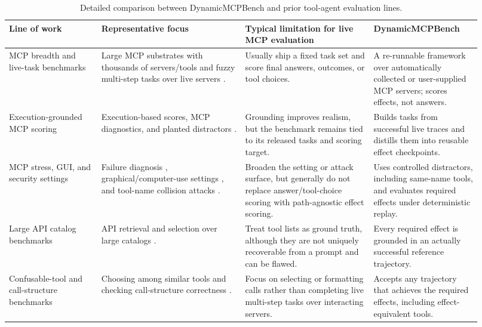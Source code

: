 \begin{table}[t]
\centering
\small
\setlength{\tabcolsep}{3.0pt}
\renewcommand{\arraystretch}{1.02}
\caption{Detailed comparison between DynamicMCPBench and prior tool-agent
evaluation lines.}
\label{tab:rw-detailed}
\begin{tabular}{p{0.18\linewidth}p{0.28\linewidth}p{0.25\linewidth}p{0.21\linewidth}}
\toprule
\textbf{Line of work} &
\textbf{Representative focus} &
\textbf{Typical limitation for live MCP evaluation} &
\textbf{DynamicMCPBench} \\
\midrule

MCP breadth and live-task benchmarks &
Large MCP substrates with thousands of servers/tools
\citep{fan2025mcptoolbench++, mo2025livemcpbench, lei2025mcpverse} and fuzzy
multi-step tasks over live servers \citep{wang2025mcp}. &
Usually ship a fixed task set and score final answers, outcomes, or tool
choices. &
A re-runnable framework over automatically collected or user-supplied MCP
servers; scores effects, not answers. \\

Execution-grounded MCP scoring &
Execution-based scores, MCP diagnostics, and planted distractors
\citep{servers25mcp, gao2025mcp, bandi2026mcp}. &
Grounding improves realism, but the benchmark remains tied to its released
tasks and scoring target. &
Builds tasks from successful live traces and distills them into reusable
effect checkpoints. \\

MCP stress, GUI, and security settings &
Failure diagnosis \citep{wu2025mcpmark, yin2025livemcp, guo2026mcp},
graphical/computer-use settings \citep{yan2025mcpworld, jia2025osworld}, and
tool-name collision attacks \citep{zhang2025mcp}. &
Broaden the setting or attack surface, but generally do not replace
answer/tool-choice scoring with path-agnostic effect scoring. &
Uses controlled distractors, including same-name tools, and evaluates required
effects under deterministic replay. \\

Large API catalog benchmarks &
API retrieval and selection over large catalogs
\citep{patil2024gorilla, qin2024toolllm}. &
Treat tool lists as ground truth, although they are not uniquely recoverable
from a prompt and can be flawed. &
Every required effect is grounded in an actually successful reference
trajectory. \\

Confusable-tool and call-structure benchmarks &
Choosing among similar tools \citep{huang2024metatool} and checking
call-structure correctness \citep{patil2025berkeley}. &
Focus on selecting or formatting calls rather than completing live multi-step
tasks over interacting servers. &
Accepts any trajectory that achieves the required effects, including
effect-equivalent tools. \\


\end{tabular}
\end{table}
